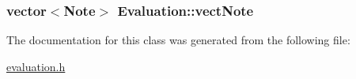 \hypertarget{class_evaluation_ad26840cec05aea45af3b1164c55a7557}{
\subsubsection[{vect\+Note}]{\setlength{\rightskip}{0pt plus 5cm}vector$<${\bf Note}$>$ Evaluation\+::vect\+Note\hspace{0.3cm}{\ttfamily [private]}}}\label{class_evaluation_ad26840cec05aea45af3b1164c55a7557}


The documentation for this class was generated from the following file\+:\begin{DoxyCompactItemize}
\item 
\hyperlink{evaluation_8h}{evaluation.\+h}\end{DoxyCompactItemize}

